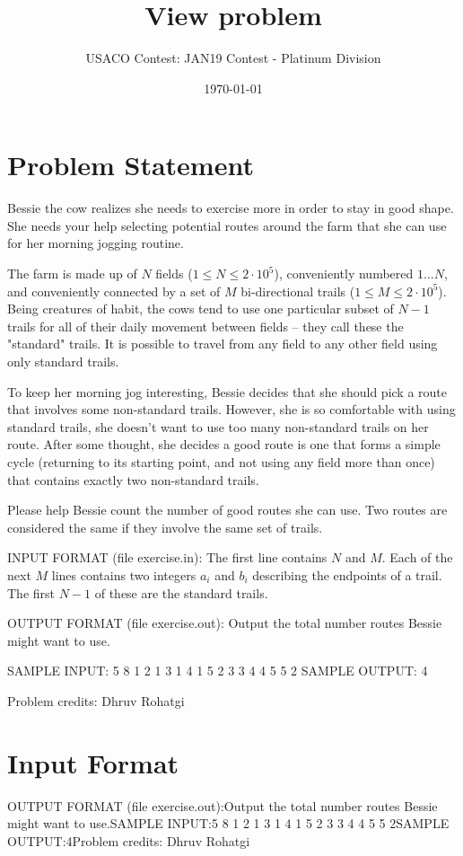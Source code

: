 \documentclass[12pt]{article}
\title{View problem}
\author{USACO Contest: JAN19 Contest - Platinum Division}
\date{\today}
\begin{document}
\maketitle

\section*{Problem Statement}

Bessie the cow realizes she needs to exercise more in order to stay in good
shape.  She needs your help selecting potential routes around the farm that she
can use for her morning jogging routine.

The farm is made up of $N$ fields ($1 \leq N \leq 2 \cdot 10^5$), conveniently
numbered $1 \ldots N$, and conveniently connected by a set of $M$ bi-directional
trails ($1 \leq M \leq 2 \cdot 10^5$).  Being creatures of habit, the cows tend
to use one particular subset of $N-1$ trails for all of their daily movement
between fields -- they call these the "standard" trails. It is  possible to
travel from any field to any other field using only standard  trails.

To keep her morning jog interesting, Bessie decides that she should pick a route
that involves some non-standard trails.  However, she is so comfortable with
using standard trails, she doesn't want to use too many non-standard trails on
her route.  After some thought, she decides a good route is one that  forms a
simple cycle (returning to its starting point, and not using any field  more
than once) that contains exactly two non-standard trails.

Please help Bessie count the number of good routes she can use.  Two
routes are considered the same if they involve the same set of trails.

INPUT FORMAT (file exercise.in):
The first line contains $N$ and $M$. Each of the next $M$ lines contains two
integers $a_i$ and $b_i$ describing the endpoints of a trail. The first $N-1$ of
these are the standard trails.

OUTPUT FORMAT (file exercise.out):
Output the total number routes Bessie might want to use.

SAMPLE INPUT:
5 8
1 2
1 3
1 4
1 5
2 3
3 4
4 5
5 2
SAMPLE OUTPUT: 
4


Problem credits: Dhruv Rohatgi



\section*{Input Format}
OUTPUT FORMAT (file exercise.out):Output the total number routes Bessie might want to use.SAMPLE INPUT:5 8
1 2
1 3
1 4
1 5
2 3
3 4
4 5
5 2SAMPLE OUTPUT:4Problem credits: Dhruv Rohatgi
\end{document}
